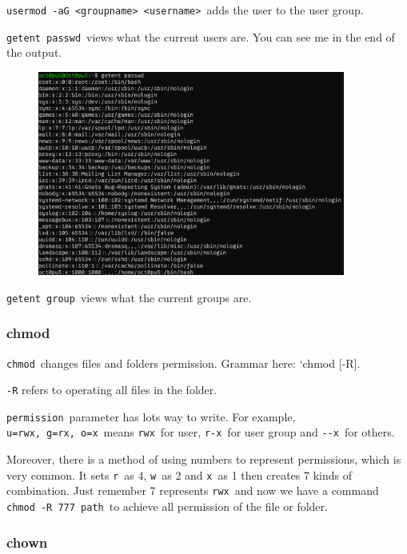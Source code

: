 \documentclass[12pt]{ctexart}
\begin{document}
\texttt{usermod\ -aG\ \textless{}groupname\textgreater{}\ \textless{}username\textgreater{}}\
adds the user to the user group.

\texttt{getent\ passwd}\ views what the current users are. You can see me
in the end of the output.

\begin{figure}[H]
    \centering
    \includegraphics[width=0.9\textwidth,keepaspectratio]{assets/Linux/1.6 Linux user and permission commands/2.png}
\end{figure}

\texttt{getent\ group}\ views what the current groups are.

\subsubsection{\textbf{chmod}}

\texttt{chmod}\ changes files and folders permission. Grammar here:
`chmod {[}-R{]}.

\texttt{-R} refers to operating all files in the folder.

\texttt{permission}\ parameter has lots way to write. For example,
\texttt{u=rwx,\ g=rx,\ o=x}\ means \texttt{rwx}\ for user, \texttt{r-x}\
for user group and \texttt{-\/-x}\ for others.

Moreover, there is a method of using numbers to represent permissions,
which is very common. It sets \texttt{r}\ as 4, \texttt{w}\ as 2 and
\texttt{x}\ as 1 then creates 7 kinds of combination. Just remember 7
represents \texttt{rwx}\ and now we have a command
\texttt{chmod\ -R\ 777\ path}\ to achieve all permission of the file or
folder.

\subsubsection{\textbf{chown}}
\end{document}
